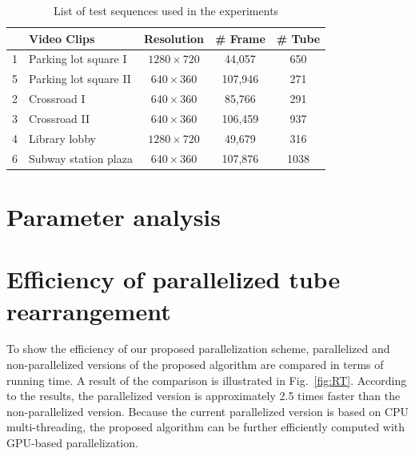 \documentclass[11pt]{hyu_thesis}
\begin{document}
\begin{table}
	\begin{center}
		\begin{tabular}{c|l|c|c|c|}
			\cline{2-5}
			& Video Clips & Resolution & \# Frame & \# Tube\\
			\hline
			\multicolumn{1}{|c|}{1} & Parking lot square I & $1280 \times 720$ & 44,057 & 650\\
			\hline
			\multicolumn{1}{|c|}{5} & Parking lot square II & $640 \times 360$ & 107,946 & 271\\
			\hline
			\multicolumn{1}{|c|}{2} & Crossroad I & $640 \times 360$ & 85,766 & 291\\
			\hline
			\multicolumn{1}{|c|}{3} & Crossroad II & $640 \times 360$ & 106,459 & 937\\
			\hline
			\multicolumn{1}{|c|}{4} & Library lobby & $1280 \times 720$ & 49,679 & 316\\
			\hline
			\multicolumn{1}{|c|}{6} & Subway station plaza & $640 \times 360$ & 107,876 & 1038\\
			\hline
		\end{tabular}
	\end{center}
	\caption{List of test sequences used in the experiments}
	\label{tb:video_list}
\end{table}

\section{Parameter analysis}


\section{Efficiency of parallelized tube rearrangement}
To show the efficiency of our proposed parallelization scheme, parallelized and non-parallelized versions of the proposed algorithm are compared in terms of running time. A result of the comparison is illustrated in Fig.~\ref{fig:RT}. According to the results, the parallelized version is approximately 2.5 times faster than the non-parallelized version. Because the current parallelized version is based on CPU multi-threading, the proposed algorithm can be further efficiently computed with GPU-based parallelization.
\end{document}
